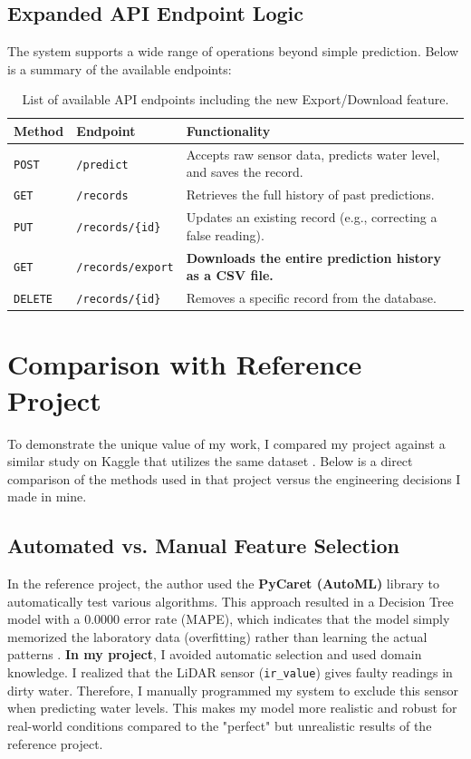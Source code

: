 \documentclass[12pt, a4paper]{article}
\begin{document}
\subsection{Expanded API Endpoint Logic}
The system supports a wide range of operations beyond simple prediction. Below is a summary of the available endpoints:

\begin{table}[H]
    \centering
    \begin{tabular}{|l|l|p{7cm}|}
    \hline
    \textbf{Method} & \textbf{Endpoint} & \textbf{Functionality} \\
    \hline
    \texttt{POST} & \texttt{/predict} & Accepts raw sensor data, predicts water level, and saves the record. \\
    \hline
    \texttt{GET} & \texttt{/records} & Retrieves the full history of past predictions. \\
    \hline
    \texttt{PUT} & \texttt{/records/\{id\}} & Updates an existing record (e.g., correcting a false reading). \\
    \hline
    \texttt{GET} & \texttt{/records/export} & \textbf{Downloads the entire prediction history as a CSV file.} \\
    \hline
    \texttt{DELETE} & \texttt{/records/\{id\}} & Removes a specific record from the database. \\
    \hline
    \end{tabular}
    \caption{List of available API endpoints including the new Export/Download feature.}
\end{table}

\section{Comparison with Reference Project}

To demonstrate the unique value of my work, I compared my project against a similar study on Kaggle that utilizes the same dataset \cite{mohan_kaggle}. Below is a direct comparison of the methods used in that project versus the engineering decisions I made in mine.

\subsection{Automated vs. Manual Feature Selection}
In the reference project, the author used the \textbf{PyCaret (AutoML)} library to automatically test various algorithms. This approach resulted in a Decision Tree model with a 0.0000 error rate (MAPE), which indicates that the model simply memorized the laboratory data (overfitting) rather than learning the actual patterns \cite{mohan_kaggle}.
\textbf{In my project}, I avoided automatic selection and used domain knowledge. I realized that the LiDAR sensor (\texttt{ir\_value}) gives faulty readings in dirty water. Therefore, I manually programmed my system to exclude this sensor when predicting water levels. This makes my model more realistic and robust for real-world conditions compared to the "perfect" but unrealistic results of the reference project.
\end{document}

